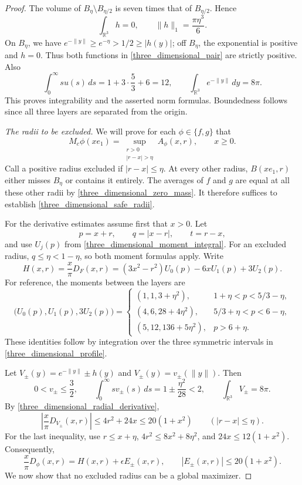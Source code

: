 \documentclass[12pt]{amsart}
\numberwithin{equation}{section}
\begin{document}
\begin{proof}
The volume of $B_\eta\setminus B_{\eta/2}$ is seven times that of
$B_{\eta/2}$. Hence
\begin{equation}
\label{three_dimensional_zero_mass}
\int_{\mathbb{R}^3}h=0,
\qquad \|h\|_1=\frac{\pi\eta^3}{6}.
\end{equation}
On $B_\eta$, we have $e^{-\|y\|}\geq e^{-\eta}>1/2\geq|h(y)|$;
off $B_\eta$, the exponential is positive and $h=0$. Thus both
functions in \eqref{three_dimensional_pair} are strictly positive.
Also
\[
\int_0^\infty s u(s)\,ds=1+3\cdot\frac53+6=12,
\qquad
\int_{\mathbb{R}^3}e^{-\|y\|}\,dy=8\pi.
\]
This proves integrability and the asserted norm formulas. Boundedness
follows since all three layers are separated from the origin.

\medskip
\noindent\textit{The radii to be excluded.}
We will prove for each $\phi\in\{f,g\}$ that
\begin{equation}
\label{three_dimensional_safe_radii}
M_c\phi(xe_1)=\sup_{\substack{r>0\\ |r-x|>\eta}}A_\phi(x,r),
\qquad x\geq0.
\end{equation}
Call a positive radius excluded if $|r-x|\leq\eta$.
At every other radius, $B(xe_1,r)$ either misses $B_\eta$ or contains
it entirely. The averages of $f$ and $g$ are equal at all these
other radii by \eqref{three_dimensional_zero_mass}.
It therefore suffices to establish \eqref{three_dimensional_safe_radii}.

For the derivative estimates assume first that $x>0$. Let
\[
p=x+r,\qquad q=|x-r|,\qquad t=r-x,
\]
and use $U_j(p)$ from \eqref{three_dimensional_moment_integral}.
For an excluded radius, $q\leq\eta<1-\eta$, so both moment formulas
apply. Write
\[
H(x,r)=\frac{x}{\pi}D_F(x,r)
       =(3x^2-r^2)U_0(p)-6xU_1(p)+3U_2(p).
\]
For reference, the moments between the layers are
\begin{equation}
\label{three_dimensional_moments}
\bigl(U_0(p),U_1(p),3U_2(p)\bigr)=
\begin{cases}
(1,1,3+\eta^2),&1+\eta<p<5/3-\eta,\\
(4,6,28+4\eta^2),&5/3+\eta<p<6-\eta,\\
(5,12,136+5\eta^2),&p>6+\eta.
\end{cases}
\end{equation}
These identities follow by integration over the three symmetric
intervals in \eqref{three_dimensional_profile}.

Let $V_\pm(y)=e^{-\|y\|}\pm h(y)$ and
$V_\pm(y)=v_\pm(\|y\|)$. Then
\[
0<v_\pm\leq\frac32,\qquad
\int_0^\infty s v_\pm(s)\,ds
          =1\pm\frac{\eta^2}{28}<2,
\qquad \int_{\mathbb{R}^3}V_\pm=8\pi.
\]
By \eqref{three_dimensional_radial_derivative},
\[
\left|\frac{x}{\pi}D_{V_\pm}(x,r)\right|
   \leq4r^2+24x\leq20(1+x^2)
       \qquad (|r-x|\leq\eta).
\]
For the last inequality, use $r\leq x+\eta$,
$4r^2\leq8x^2+8\eta^2$, and $24x\leq12(1+x^2)$.
Consequently,
\begin{equation}
\label{three_dimensional_derivative_error}
\frac{x}{\pi}D_\phi(x,r)=H(x,r)+\epsilon E_\pm(x,r),
\qquad |E_\pm(x,r)|\leq20(1+x^2).
\end{equation}
We now show that no excluded radius can be a global maximizer.


\end{proof}
\end{document}
